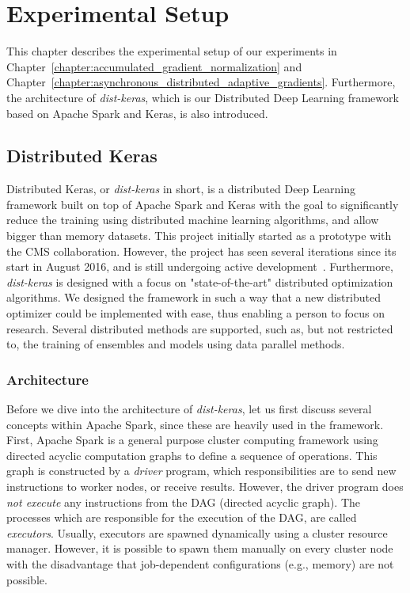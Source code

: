 %
%
%

\chapter{Experimental Setup}
\label{chapter:experiments}

This chapter describes the experimental setup of our experiments in Chapter~\ref{chapter:accumulated_gradient_normalization} and Chapter~\ref{chapter:asynchronous_distributed_adaptive_gradients}. Furthermore, the architecture of \emph{dist-keras}, which is our Distributed Deep Learning framework based on Apache Spark and Keras, is also introduced.

\section{Distributed Keras}
\label{sec:distributed_keras}

Distributed Keras, or \emph{dist-keras} in short, is a distributed Deep Learning framework built on top of Apache Spark and Keras with the goal to significantly reduce the training using distributed machine learning algorithms, and allow bigger than memory datasets. This project initially started as a prototype with the CMS collaboration. However, the project has seen several iterations since its start in August 2016, and is still undergoing active development~\cite{dist_keras}. Furthermore, \emph{dist-keras} is designed with a focus on "state-of-the-art" distributed optimization algorithms. We designed the framework in such a way that a new distributed optimizer could be implemented with ease, thus enabling a person to focus on research. Several distributed methods are supported, such as, but not restricted to, the training of ensembles and models using data parallel methods.

\subsection{Architecture}
\label{sec:dist_keras_architecture}

Before we dive into the architecture of \emph{dist-keras}, let us first discuss several concepts within Apache Spark, since these are heavily used in the framework. First, Apache Spark is a general purpose cluster computing framework using directed acyclic computation graphs to define a sequence of operations. This graph is constructed by a \emph{driver} program, which responsibilities are to send new instructions to worker nodes, or receive results. However, the driver program does \emph{not execute} any instructions from the DAG (directed acyclic graph). The processes which are responsible for the execution of the DAG, are called \emph{executors}. Usually, executors are spawned dynamically using a cluster resource manager. However, it is possible to spawn them manually on every cluster node with the disadvantage that job-dependent configurations (e.g., memory) are not possible.\\

